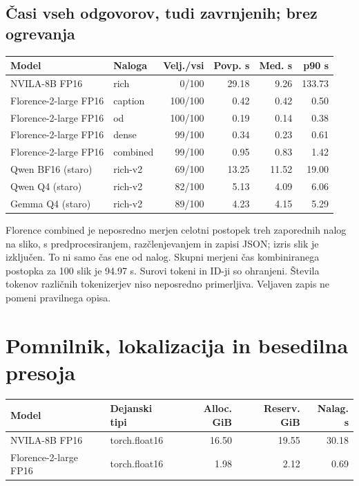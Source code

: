 \documentclass[10pt,a4paper]{article}
\begin{document}
\subsection*{Časi vseh odgovorov, tudi zavrnjenih; brez ogrevanja}
\begin{center}\small\begin{tabular}{p{3.4cm}p{3.1cm}rrrr}\toprule
Model & Naloga & Velj./vsi & Povp. s & Med. s & p90 s \\ \midrule
NVILA-8B FP16 & rich & 0/100 & 29.18 & 9.26 & 133.73 \\
Florence-2-large FP16 & caption & 100/100 & 0.42 & 0.42 & 0.50 \\
Florence-2-large FP16 & od & 100/100 & 0.19 & 0.14 & 0.38 \\
Florence-2-large FP16 & dense & 99/100 & 0.34 & 0.23 & 0.61 \\
Florence-2-large FP16 & combined & 99/100 & 0.95 & 0.83 & 1.42 \\
Qwen BF16 (staro) & rich-v2 & 69/100 & 13.25 & 11.52 & 19.00 \\
Qwen Q4 (staro) & rich-v2 & 82/100 & 5.13 & 4.09 & 6.06 \\
Gemma Q4 (staro) & rich-v2 & 89/100 & 4.23 & 4.15 & 5.29 \\
\bottomrule\end{tabular}\end{center}

Florence combined je neposredno merjen celotni postopek treh zaporednih nalog na sliko, s predprocesiranjem, razčlenjevanjem in zapisi JSON; izris slik je izključen. To ni samo čas ene od nalog. Skupni merjeni čas kombiniranega postopka za 100 slik je 94.97 s. Surovi tokeni in ID-ji so ohranjeni. Števila tokenov različnih tokenizerjev niso neposredno primerljiva. Veljaven zapis ne pomeni pravilnega opisa.

\newpage
\section*{Pomnilnik, lokalizacija in besedilna presoja}
\begin{center}\small\begin{tabular}{p{4cm}p{3.8cm}rrr}\toprule
Model & Dejanski tipi & Alloc. GiB & Reserv. GiB & Nalag. s \\ \midrule
NVILA-8B FP16 & torch.float16 & 16.50 & 19.55 & 30.18 \\
Florence-2-large FP16 & torch.float16 & 1.98 & 2.12 & 0.69 \\
\bottomrule\end{tabular}\end{center}
\end{document}

